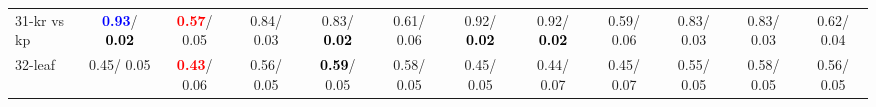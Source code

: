 \begin{table}[h]
\begin{center}
{\begin{tabular}{lc|c|c|c|c|c|c|c|c|c|c}
31-kr vs kp & \textcolor{blue}{\textbf{  0.93}}/\textcolor{black}{\textbf{  0.02}} & \textcolor{red}{\textbf{  0.57}}/  0.05 &   0.84/  0.03 &   0.83/\textcolor{black}{\textbf{  0.02}} &   0.61/  0.06 &   0.92/\textcolor{black}{\textbf{  0.02}} &   0.92/\textcolor{black}{\textbf{  0.02}} &   0.59/  0.06 &   0.83/  0.03 &   0.83/  0.03 &   0.62/  0.04 \\
32-leaf &   0.45/  0.05 & \textcolor{red}{\textbf{  0.43}}/  0.06 &   0.56/  0.05 & \textcolor{black}{\textbf{  0.59}}/  0.05 &   0.58/  0.05 &   0.45/  0.05 &   0.44/  0.07 &   0.45/  0.07 &   0.55/  0.05 &   0.58/  0.05 &   0.56/  0.05 \\\end{tabular}}\label{stratsBalAcc0bNB}
\end{center}
\end{table}
